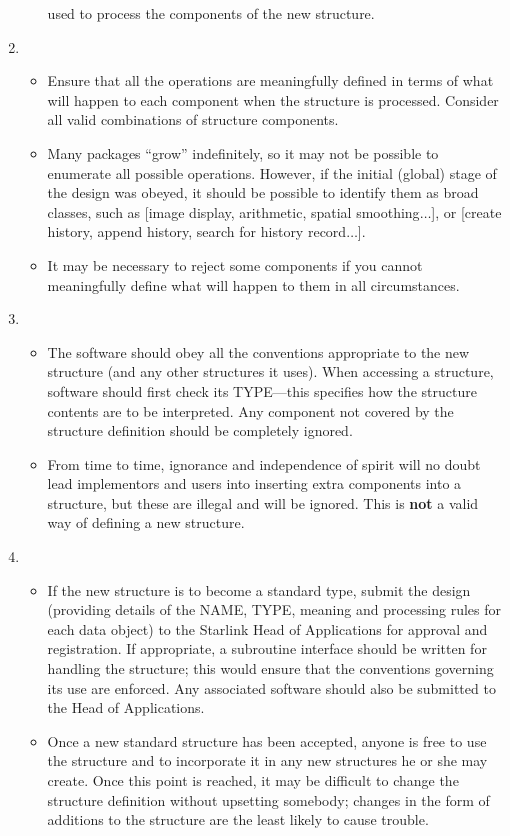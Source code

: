 \documentclass[twoside,11pt,nolof,noabs]{starlink}
\begin{document}
\begin{enumerate}
\begin{itemize}
used to process the components of the new structure.
\end{itemize}
\html{\label{se:expnote7}}
\item
\begin{itemize}
\item
Ensure that all the operations are meaningfully defined in terms of what
will happen to each component when the structure is processed. Consider
all valid combinations of structure components.
\item
Many packages ``grow'' indefinitely, so it may not be possible to
enumerate all possible operations.  However, if
the initial (global) stage of
the design was obeyed, it should be possible to identify them as broad
classes, such as [image display, arithmetic, spatial smoothing$\ldots$], or
[create history, append history, search for history record$\ldots$].
\item
It may be necessary to reject some components if you cannot meaningfully
define what will happen to them in all circumstances.
\end{itemize}
\html{\label{se:expnote8}}
\item
\begin{itemize}
\item
The software should obey all the conventions appropriate to
the new structure (and any other structures it uses).  When accessing a
structure, software should first check its TYPE---this specifies how the
structure contents are to be interpreted. Any component not covered by
the structure definition should be completely ignored.
\item
From time to time, ignorance and independence of spirit will no doubt
lead implementors and users into inserting extra components into a
structure, but these are illegal and will be ignored.  This is \textbf{not}
a valid way of defining a new structure.
\end{itemize}
\html{\label{se:expnote9}}
\item
\begin{itemize}
\item
If the new structure is to become a standard type, submit the design
(providing details of the NAME, TYPE, meaning and processing rules
for each data object) to the Starlink Head of Applications for approval
and registration.  If appropriate, a
subroutine interface should be written for handling the structure;
this would ensure that the conventions governing its use are enforced.
Any associated software should also be submitted to the Head of Applications.
\item
Once a new standard structure has been accepted,
anyone is free to use the structure and to
incorporate it in any new structures he or she may create. Once
this point is reached, it may be difficult to change the structure
definition without upsetting somebody;
changes in the form of additions to the structure are the least likely
to cause trouble.
\end{itemize}
\end{enumerate}
\end{document}
